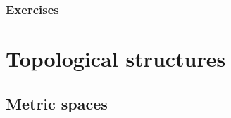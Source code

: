 \documentclass{../../large}
\begin{document}
\section*{Exercises}
\begin{prb}
\end{prb}
\begin{prb}
\end{prb}
\begin{prb}
\end{prb}
\begin{prb}
\end{prb}
\begin{prb}
\end{prb}



\part{Topological structures}

\chapter{Metric spaces}
\end{document}

